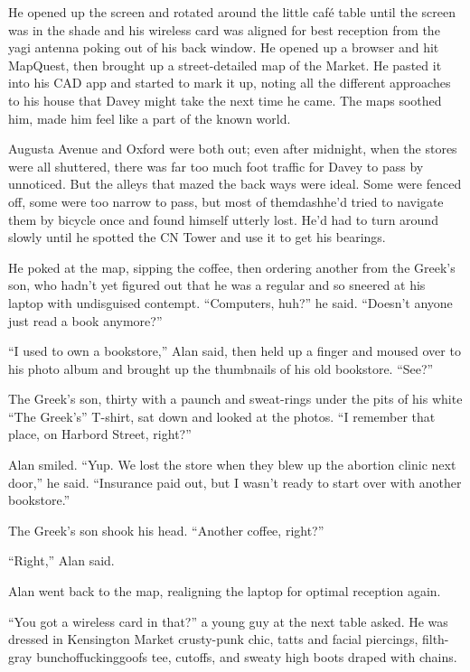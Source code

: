He opened up the screen and rotated around the little caf\'{e} table
until the screen was in the shade and his wireless card was aligned
for best reception from the yagi antenna poking out of his back
window.  He opened up a browser and hit MapQuest, then brought up a
street-detailed map of the Market.  He pasted it into his CAD app and
started to mark it up, noting all the different approaches to his
house that Davey might take the next time he came.  The maps soothed
him, made him feel like a part of the known world.

Augusta Avenue and Oxford were both out; even after midnight, when the
stores were all shuttered, there was far too much foot traffic for
Davey to pass by unnoticed.  But the alleys that mazed the back ways
were ideal.  Some were fenced off, some were too narrow to pass, but
most of themdash{}he'd tried to navigate them by bicycle once and found
himself utterly lost.  He'd had to turn around slowly until he spotted
the CN Tower and use it to get his bearings.

He poked at the map, sipping the coffee, then ordering another from
the Greek's son, who hadn't yet figured out that he was a regular and
so sneered at his laptop with undisguised contempt.  ``Computers,
huh?'' he said.  ``Doesn't anyone just read a book anymore?''

``I used to own a bookstore,'' Alan said, then held up a finger and
moused over to his photo album and brought up the thumbnails of his
old bookstore.  ``See?''

The Greek's son, thirty with a paunch and sweat-rings under the pits
of his white ``The Greek's'' T-shirt, sat down and looked at the
photos.  ``I remember that place, on Harbord Street, right?''

Alan smiled.  ``Yup.  We lost the store when they blew up the abortion
clinic next door,'' he said.  ``Insurance paid out, but I wasn't ready
to start over with another bookstore.''

The Greek's son shook his head.  ``Another coffee, right?''

``Right,'' Alan said.

Alan went back to the map, realigning the laptop for optimal reception
again.

``You got a wireless card in that?'' a young guy at the next table
asked.  He was dressed in Kensington Market crusty-punk chic, tatts
and facial piercings, filth-gray bunchoffuckinggoofs tee, cutoffs, and
sweaty high boots draped with chains.

